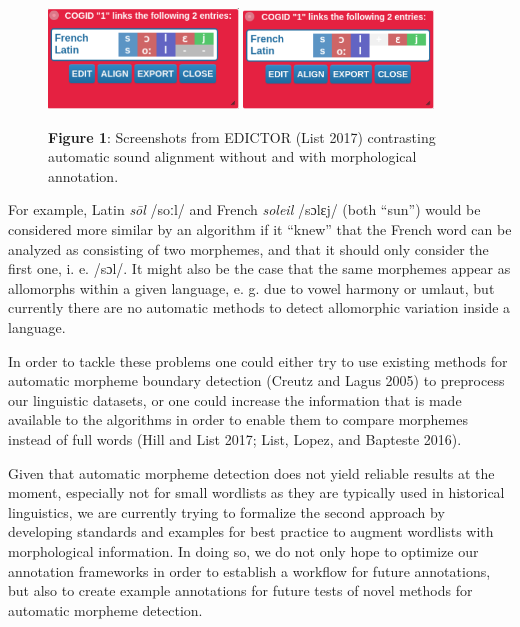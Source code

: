 \documentclass[
  a4paper,
  14pt,
  oneside,
  tablecaptionabove
]{scrbook}
\begin{document}
\begin{figure}[htb]
\centering
\includegraphics[width=0.45\textwidth]{images/graphic-1.png}
\includegraphics[width=0.45\textwidth]{images/graphic-2.png}
\captionsetup{justification=centering}
\caption*{\small \textbf{Figure 1}: Screenshots from EDICTOR (List 2017) contrasting
automatic sound alignment without and with morphological annotation.}
\end{figure}

For example, Latin \emph{sōl} /soːl/ and French \emph{soleil} /sɔlɛj/
(both \enquote{sun}) would be considered more similar by an algorithm if
it \enquote{knew} that the French word can be analyzed as consisting of
two morphemes, and that it should only consider the first one, i. e.
/sɔl/. It might also be the case that the same morphemes appear as
allomorphs within a given language, e. g. due to vowel harmony or
umlaut, but currently there are no automatic methods to detect
allomorphic variation inside a language.

In order to tackle these problems one could either try to use existing
methods for automatic morpheme boundary detection (Creutz and Lagus
2005) to preprocess our linguistic datasets, or one could increase the
information that is made available to the algorithms in order to enable
them to compare morphemes instead of full words (Hill and List 2017;
List, Lopez, and Bapteste 2016).

Given that automatic morpheme detection does not yield reliable results
at the moment, especially not for small wordlists as they are typically
used in historical linguistics, we are currently trying to formalize the
second approach by developing standards and examples for best practice
to augment wordlists with morphological information. In doing so, we do
not only hope to optimize our annotation frameworks in order to
establish a workflow for future annotations, but also to create example
annotations for future tests of novel methods for automatic morpheme
detection.
\end{document}
